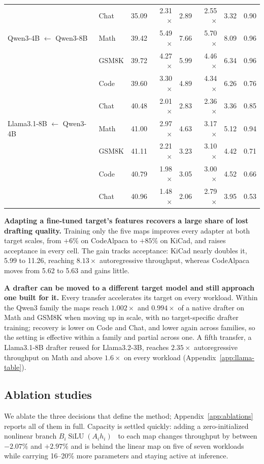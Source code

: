 \begin{table}[t]
\begin{tabular}{llrrrrrr}
 & Chat & 35.09 & 2.31$\times$ & 2.89 & 2.55$\times$ & 3.32 & 0.90 \\
\addlinespace[1pt]
Qwen3-4B $\leftarrow$ Qwen3-8B & Math & 39.42 & 5.49$\times$ & 7.66 & 5.70$\times$ & 8.09 & 0.96 \\
 & GSM8K & 39.72 & 4.27$\times$ & 5.99 & 4.46$\times$ & 6.34 & 0.96 \\
 & Code & 39.60 & 3.30$\times$ & 4.89 & 4.34$\times$ & 6.26 & 0.76 \\
 & Chat & 40.48 & 2.01$\times$ & 2.83 & 2.36$\times$ & 3.36 & 0.85 \\
\addlinespace[1pt]
Llama3.1-8B $\leftarrow$ Qwen3-4B & Math & 41.00 & 2.97$\times$ & 4.63 & 3.17$\times$ & 5.12 & 0.94 \\
 & GSM8K & 41.11 & 2.21$\times$ & 3.23 & 3.10$\times$ & 4.42 & 0.71 \\
 & Code & 40.79 & 1.98$\times$ & 3.05 & 3.00$\times$ & 4.52 & 0.66 \\
 & Chat & 40.96 & 1.48$\times$ & 2.06 & 2.79$\times$ & 3.95 & 0.53 \\
\bottomrule
\end{tabular}
\setlength{\tabcolsep}{6pt}
\end{table}

\textbf{Adapting a fine-tuned target's features recovers a large share of lost drafting quality.} Training only the five maps improves every adapter at both target scales, from $+6\%$ on CodeAlpaca to $+85\%$ on KiCad, and raises acceptance in every cell. The gain tracks acceptance: KiCad nearly doubles it, 5.99 to 11.26, reaching $8.13\times$ autoregressive throughput, whereas CodeAlpaca moves from 5.62 to 5.63 and gains little.

\textbf{A drafter can be moved to a different target model and still approach one built for it.} Every transfer accelerates its target on every workload. Within the Qwen3 family the maps reach $1.002\times$ and $0.994\times$ of a native drafter on Math and GSM8K when moving up in scale, with no target-specific drafter training; recovery is lower on Code and Chat, and lower again across families, so the setting is effective within a family and partial across one. A fifth transfer, a Llama3.1-8B drafter reused for Llama3.2-3B, reaches $2.35\times$ autoregressive throughput on Math and above $1.6\times$ on every workload (Appendix~\ref{app:llama-table}).

\subsection{Ablation studies}
\label{sec:ablations}
We ablate the three decisions that define the method; Appendix~\ref{app:ablations} reports all of them in full. Capacity is settled quickly: adding a zero-initialized nonlinear branch $B_i\operatorname{SiLU}(A_ih_i)$~\citep{elfwing2018silu} to each map changes throughput by between $-2.07\%$ and $+2.97\%$ and is behind the linear map on five of seven workloads while carrying 16--20\% more parameters and staying active at inference.

